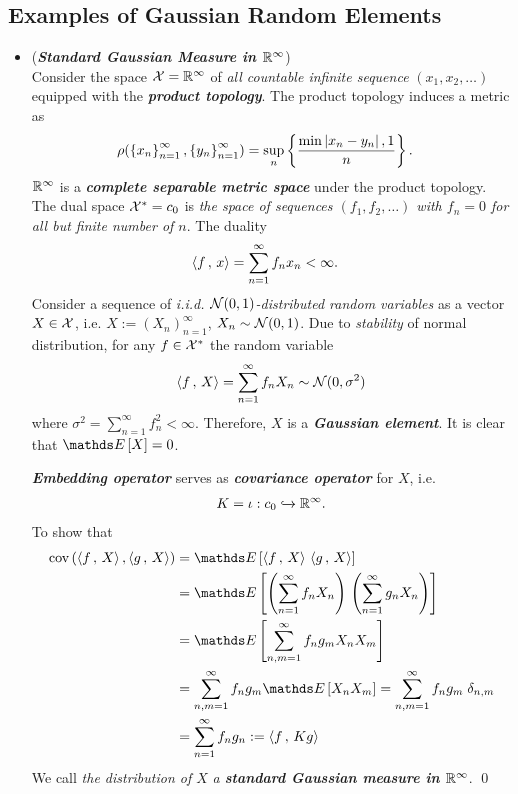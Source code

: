 \documentclass[11pt]{article}
\begin{document}
\subsection{Examples of Gaussian Random Elements}
\begin{itemize}
\item \begin{example} (\emph{\textbf{Standard Gaussian Measure in ${\mathbb R}^{\infty}$}})\\
Consider the space ${\mathcal X} = {\mathbb R}^{\infty}$ of \emph{all countable infinite sequence} $(x_1, x_2, \ldots)$ equipped with the \emph{\textbf{product topology}}. The product topology induces a metric as
\begin{align*}
\rho(\left\{x_n\right\}_{n=1}^{\infty}, \left\{y_n\right\}_{n=1}^{\infty}) &= \sup_{n}\left\{\frac{\min{\left\lvert x_n - y_n \right\rvert, 1}}{n}\right\}.
\end{align*} ${\mathbb R}^{\infty}$ is a \emph{\textbf{complete separable metric space}} under the product topology. The dual space ${\mathcal X}^{*} = c_{0}$ is \emph{the space of sequences $(f_1, f_2, \ldots)$ with $f_n = 0$ for all but finite number of $n$}. The duality 
\begin{align*}
\left\langle f\,,\, x \right\rangle &= \sum_{n=1}^{\infty}f_n x_n < \infty.
\end{align*}
Consider a sequence of \emph{i.i.d. ${\mathcal N}(0, 1)$-distributed random variables} as a vector $X \in {\mathcal X}$, i.e. $X := (X_n)_{n=1}^{\infty}$, $X_n \sim {\mathcal N}(0,1)$. Due to \emph{stability} of normal distribution, for any $f \in {\mathcal X}^{*}$ the random variable 
\begin{align*}
\left\langle f\,,\, X \right\rangle = \sum_{n=1}^{\infty}f_n X_n \sim {\mathcal N}(0, \sigma^2)
\end{align*} where $\sigma^2 = \sum_{n=1}^{\infty}f_n^2 < \infty$. Therefore, $X$ is a \emph{\textbf{Gaussian element}}. It is clear that $\E{}{X} = 0$. 

\emph{\textbf{Embedding operator}} serves as \emph{\textbf{covariance operator}} for $X$, i.e.
\begin{align*}
K = \iota: c_0  \xhookrightarrow{} {\mathbb R}^{\infty}. 
\end{align*} To show that
\begin{align*}
\text{cov}\paren{\inn{f}{X}, \inn{g}{X}} &= \E{}{\inn{f}{X}\,\inn{g}{X}} \\
&= \E{}{\paren{\sum_{n=1}^{\infty}f_n X_n}\, \paren{\sum_{n=1}^{\infty}g_n X_n}}\\
&= \E{}{\sum_{n,m=1}^{\infty}f_n g_m X_n X_m}\\
&= \sum_{n,m=1}^{\infty}f_n g_m  \E{}{X_n X_m} = \sum_{n,m=1}^{\infty}f_n g_m\;  \delta_{n,m}\\
&= \sum_{n=1}^{\infty}f_n g_n := \inn{f}{Kg}
\end{align*} We call \emph{the distribution of $X$} \emph{a \textbf{standard Gaussian measure in ${\mathbb R}^{\infty}$}}. \qed



\end{example}
\end{itemize}
\end{document}
